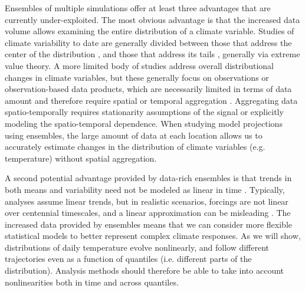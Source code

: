 \documentclass{ametsoc}
\begin{document}
Ensembles of multiple simulations offer at least three advantages that are currently under-exploited. The most obvious advantage is that the increased data volume allows examining the entire distribution of a climate variable.
 Studies of climate variability to date are generally divided between those that address the center of the distribution 
\citep[e.g.][]{semenov2002secular,raisanen2002co2, kitoh2009changes, screen2014arctic, schneider2015physics}, and those that address its tails \citep[e.g.][]{katz1992extreme, meehl2009relative, northrop2011threshold, davison2012statistical, huser2014space, trenberth2015attribution, huang2015estimating, jalbert2017spatiotemporal}, generally via extreme value theory. %
A more limited body of studies address overall distributional changes in climate variables, but these generally focus on observations or observation-based data products, which are necessarily limited in terms of data amount and therefore require spatial or temporal aggregation \citep{donat2012shifting, stainforth2013mapping, chapman2013estimating, huybers2014us, mckinnon2016changing, rhines2017seasonally}. Aggregating data spatio-temporally requires stationarity assumptions of the signal or explicitly modeling the spatio-temporal dependence. When studying model projections using ensembles, the large amount of data at each location allows us to accurately estimate changes in the distribution of climate variables (e.g. temperature) without spatial aggregation.

A second potential advantage provided by data-rich ensembles is that trends in both means and variability need not be modeled as linear in time \citep{franzke2015local,gao2017quantile}. Typically, analyses assume linear trends,  
but in realistic scenarios, forcings are not linear over centennial timescales, and a linear approximation can be misleading \citep[see for example][]{poppick2017estimating}. The increased data provided by ensembles means that we can consider more flexible statistical models to better represent complex climate responses. %
As we will show, distributions of daily temperature evolve nonlinearly, and follow different trajectories even as a function of quantiles (i.e. different parts of the distribution). %
Analysis methods should therefore be able to take into account nonlinearities both in time and across quantiles. 
\end{document}
